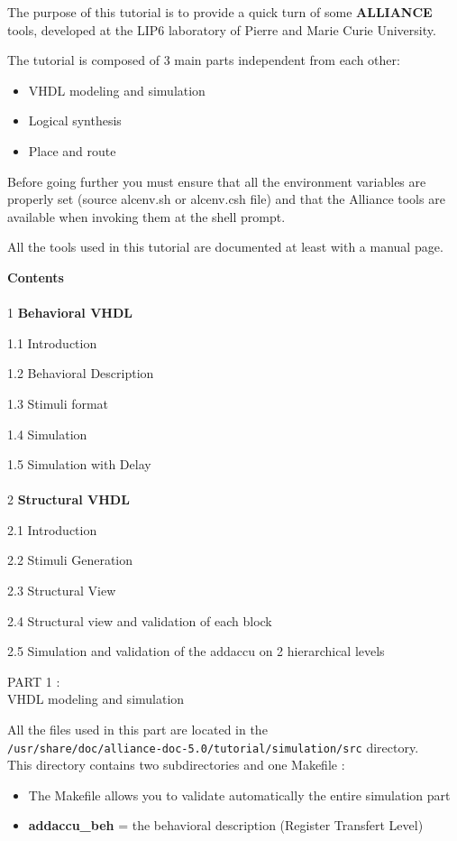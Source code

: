 \documentclass{article}
\begin{document}
\newpage
\large{ The purpose of this tutorial is to provide a quick turn of some { \bf
ALLIANCE } tools, developed at the LIP6 laboratory of Pierre and Marie Curie
University.

The tutorial is composed of 3 main parts independent from each other:

\begin{itemize}\itemsep=-.8ex
\item {VHDL modeling and simulation}
\item {Logical synthesis}
\item {Place and route}
\end{itemize}

Before going further you must ensure that all the environment variables are
properly set (source alcenv.sh or alcenv.csh file)
and that the Alliance tools are available when invoking them at the shell
prompt.

All the tools used in this tutorial are documented at least with a
manual page.

\newpage
{\bf Contents}\\
\\
{1} {\bf Behavioral VHDL}

{1.1} Introduction

{1.2} Behavioral Description

{1.3} Stimuli format

{1.4} Simulation

{1.5} Simulation with Delay\\
\\
{2} {\bf Structural VHDL}

{2.1} Introduction

{2.2} Stimuli Generation

{2.3} Structural View

{2.4} Structural view and validation of each block

{2.5} Simulation and validation of the addaccu on 2 hierarchical levels

\newpage
        {\huge
        PART 1 :\\ }
        \vspace{1cm}
        {\huge
        VHDL modeling and simulation
        }

All the files used in this part are located in the \\ 
\texttt{/usr/share/doc/alliance-doc-5.0/tutorial/simulation/src} directory.\\
This directory contains two subdirectories and one Makefile : 
\begin{itemize}
\item The Makefile allows you to validate automatically the entire simulation part
\item {\bf addaccu\_beh} = the behavioral description (Register Transfert Level)


\end{itemize}}
\end{document}
